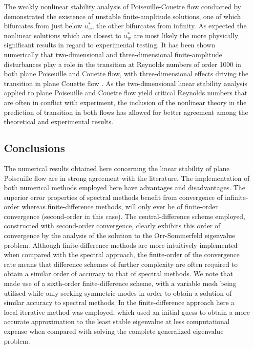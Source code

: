 \documentclass[a4paper, 12pt, twoside, openright]{article}
\numberwithin{equation}{section}
\begin{document}
The weakly nonlinear stability analysis of Poiseuille-Couette flow conducted by \cite{CowleyandSmith85} demonstrated the existence of unstable finite-amplitude solutions, one of which bifurcates from just below $u_w^{*}$, the other bifurcates from infinity. As expected the nonlinear solutions which are closest to $u_w^*$ are most likely the more physically significant results in regard to experimental testing. It has been shown numerically that two-dimensional and three-dimensional finite-amplitude disturbances play a role in the transition at Reynolds numbers of order 1000 in both plane Poiseuille and Couette flow, with three-dimensional effects driving the transition in plane Couette flow \citep{OrszagandKells80}. As the two-dimensional linear stability analysis applied to plane Poiseuille and Couette flow yield critical Reynolds numbers that are often in conflict with experiment, the inclusion of the nonlinear theory in the prediction of transition in both flows has allowed for better agreement among the theoretical and experimental results. \\

\subsection{Conclusions}

The numerical results obtained here concerning the linear stability of plane Poiseuille flow are in strong agreement with the literature. The implementation of both numerical methods employed here have advantages and disadvantages. The superior error properties of spectral methods benefit from convergence of infinite-order whereas finite-difference methods, will only ever be of finite-order convergence (second-order in this case). The central-difference scheme employed, constructed with second-order convergence, clearly exhibits this order of convergence by the analysis of the solution to the Orr-Sommerfeld eigenvalue problem. Although finite-difference methods are more intuitively implemented when compared with the spectral approach, the finite-order of the convergence rate means that difference schemes of further complexity are often required to obtain a similar order of accuracy to that of spectral methods. We note that \cite{GaryandHelgason70} made use of a sixth-order finite-difference scheme, with a variable mesh being utilised while only seeking symmetric modes in order to obtain a solution of similar accuracy to spectral methods. In the finite-difference approach here a local iterative method was employed, which used an initial guess to obtain a more accurate approximation to the least stable eigenvalue at less computational expense when compared with solving the complete generalized eigenvalue problem.
  
\end{document}
